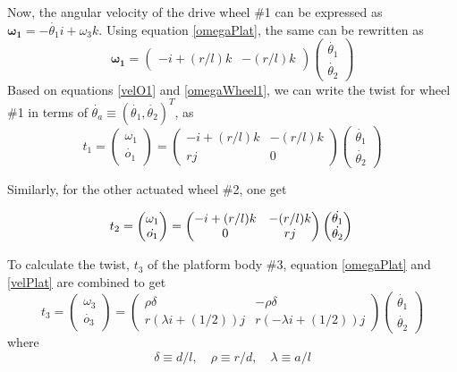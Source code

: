 Now, the angular velocity of the drive wheel \#1 can be expressed as $\bm{\omega_1}=-\dot{\theta_1}i+\omega_3k$. Using equation \ref{omegaPlat}, the same can be rewritten as 
\begin{equation}
\label{omegaWheel1}
\bm{\omega_1}=\begin{pmatrix}
-i+(r/l)k & -(r/l)k
\end{pmatrix}
\begin{pmatrix}
\dot{\theta_1}\\\dot{\theta_2}
\end{pmatrix}
\end{equation}
Based on  equations \ref{velO1} and \ref{omegaWheel1}, we can write the twist for wheel \#1 in terms of $\dot{\theta_a}\equiv (\dot{\theta_1},\dot{\theta_2})^T$, as 
\begin{equation}
\label{twist1}
t_1=\begin{pmatrix}
\omega_1\\\dot{o_1}
\end{pmatrix}=
\begin{pmatrix}
-i+(r/l)k & -(r/l)k\\ rj & 0
\end{pmatrix}
\begin{pmatrix}
\dot{\theta_1}\\\dot{\theta_2}
\end{pmatrix}
\end{equation}

Similarly, for the other actuated wheel \#2, one get

\begin{equation}
\label{twist2}
t_2=\begin{pmatrix}
\omega_1\\\dot{o_1}
\end{pmatrix}=
		\begin{pmatrix}
		-i+(r/l)k & -(r/l)k\\  0 &rj
		\end{pmatrix}
		\begin{pmatrix}
		\dot{\theta_1}\\\dot{\theta_2}
		\end{pmatrix}\\
		\end{equation}

To calculate the twist, $t_3$ of the platform body \#3, equation \ref{omegaPlat} and \ref{velPlat} are combined to get
\begin{equation}
\label{twist3}
t_3=\begin{pmatrix}
\omega_3\\\dot{o_3}
\end{pmatrix}=
\begin{pmatrix}
\rho\delta & -\rho\delta\\
r(\lambda i+(1/2))j & r(-\lambda i+(1/2))j
\end{pmatrix}
\begin{pmatrix}
\dot{\theta_1}\\\dot{\theta_2}
\end{pmatrix}
\end{equation}
where
\[ \delta\equiv d/l, \quad \rho \equiv r/d, \quad \lambda \equiv a/l \]

